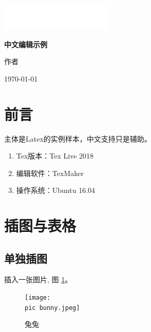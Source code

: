 \documentclass[10pt,a4paper,utf8]{article}
\newcommand{\pic}{./pic/}
\begin{document}
\begin{CJK}{UTF8}{gbsn}
\begin{titlepage}
	\centering
	\includegraphics[scale=1]{./pic/white-block.png}\par
	\vspace{1cm}
	\begin{Huge}
		\textbf{中文编辑示例}\par
	\end{Huge}
	\vspace{15cm}
	\begin{LARGE}
		作者 \par\vspace{1cm}
		\today
	\end{LARGE}
\end{titlepage}
\tableofcontents
\thispagestyle{empty}
\newpage
\setcounter{page}{1}
\section{前言}
主体是Latex的实例样本，中文支持只是辅助。

\begin{enumerate}
\item Tex版本：Tex Live 2018
\item 编辑软件：TexMaker
\item 操作系统：Ubuntu 16.04
\end{enumerate}
\section{插图与表格}
\subsection{单独插图}
插入一张图片, 图 \ref{fig:bunny}。
\begin{figure}[H]
\centering
\begin{ffigbox}
{\caption{兔兔}\label{fig:bunny}}
{\texttt{[image: \\pic bunny.jpeg]}}
\end{ffigbox}
\end{figure}

\end{CJK}
\end{document}

